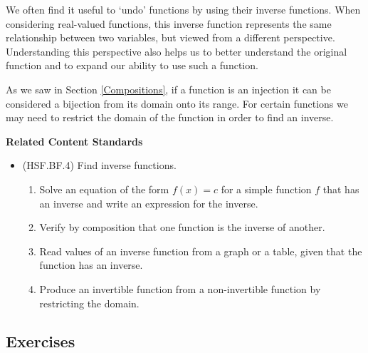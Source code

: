 \documentclass[
]{book}
\providecommand{\tightlist}{%
  \setlength{\itemsep}{0pt}\setlength{\parskip}{0pt}}
\newenvironment{standards}{}{}
\theoremstyle{definition}
\theoremstyle{definition}
\theoremstyle{definition}
\theoremstyle{definition}
\theoremstyle{remark}
\begin{document}
We often find it useful to `undo' functions by using their inverse functions. When considering real-valued functions, this inverse function represents the same relationship between two variables, but viewed from a different perspective. Understanding this perspective also helps us to better understand the original function and to expand our ability to use such a function.

As we saw in Section \ref{Compositions}, if a function is an injection it can be considered a bijection from its domain onto its range. For certain functions we may need to restrict the domain of the function in order to find an inverse.

\begin{standards}

\begin{center}
\textbf{Related Content Standards}

\end{center}

\begin{itemize}
\tightlist
\item
  (HSF.BF.4) Find inverse functions.

  \begin{enumerate}
  \def\labelenumi{\alph{enumi}.}
  \tightlist
  \item
    Solve an equation of the form \(f(x) = c\) for a simple function \(f\) that has an inverse and write an expression for the inverse.
  \item
    Verify by composition that one function is the inverse of another.
  \item
    Read values of an inverse function from a graph or a table, given that the function has an inverse.
  \item
    Produce an invertible function from a non-invertible function by restricting the domain.
  \end{enumerate}
\end{itemize}

\end{standards}

\hypertarget{exercises-28}{%
\subsection{Exercises}\label{exercises-28}}
\end{document}
